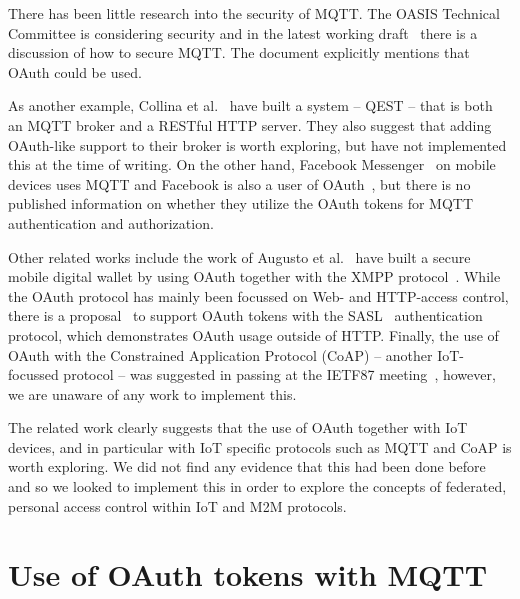 \documentclass{IEEEtran}
\newif\iflong
\begin{document}
There has been little research into the security of MQTT. The OASIS Technical Committee is considering security and 
in the latest working draft~\cite{oasis-mqtt-311-wd15} there is a discussion of how to secure MQTT. 
The document explicitly mentions that OAuth could be used.
\iflong
\begin{quote}
[Implementations] may provide their own authentication mechanism, use an
external authentication system such as LDAP or Oauth tokens, or leverage operating system
authentication mechanisms.
\end{quote}
\fi
As another example, Collina et al.~\cite{collina2012introducing} have built a system -- QEST -- that is both an MQTT broker and 
 a RESTful HTTP server. They also 
suggest that adding OAuth-like support to their broker is worth exploring, but have not implemented this at the time of writing.
On the other hand, Facebook Messenger~\cite{facebook-mqtt} on mobile devices uses MQTT and Facebook is also a user of OAuth~\cite{facebook-login}, but there is 
no published information on whether they utilize the OAuth tokens for MQTT authentication and
authorization.

Other related works include the work of Augusto et al.~\cite{augusto2011xmpp} have built a secure mobile digital wallet by using OAuth together
with the XMPP protocol~\cite{saint2011extensible}. While the OAuth protocol has mainly been focussed on Web- and HTTP-access control, there is a 
proposal~\cite{mills2011sasl} to support OAuth tokens with the SASL~\cite{myers1997simple} authentication
protocol, which demonstrates OAuth usage outside of HTTP. Finally, the use of OAuth with the Constrained Application Protocol (CoAP) -- another IoT-focussed protocol -- was suggested in passing at the 
IETF87 meeting~\cite{ietf87-minutes}, however, we are unaware of any work to implement this.

The related work clearly suggests that the use of OAuth together with IoT devices, and in particular
with IoT specific protocols such as MQTT and CoAP is worth exploring. We did not find any evidence 
that this had been done before and so we looked to implement this in order to explore the concepts
of federated, personal access control within IoT and M2M protocols.

\iflong
\section{Use of OAuth tokens with MQTT}
\end{document}

